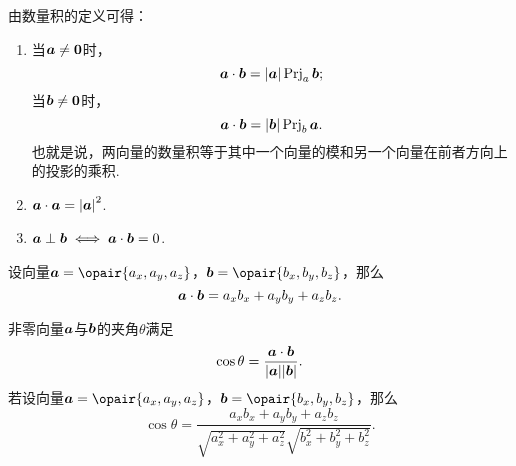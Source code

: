 \begin{property}
由数量积的定义可得：\begin{enumerate}
\item 当\(\boldsymbol{a}\neq\boldsymbol{0}\)时，\[
\boldsymbol{a}\cdot\boldsymbol{b} = \abs{\boldsymbol{a}} \operatorname{Prj}_a\boldsymbol{b};
\]当\(\boldsymbol{b}\neq\boldsymbol{0}\)时，\[
\boldsymbol{a}\cdot\boldsymbol{b} = \abs{\boldsymbol{b}} \operatorname{Prj}_b\boldsymbol{a}.
\]也就是说，两向量的数量积等于其中一个向量的模和另一个向量在前者方向上的投影的乘积.
\item \(\boldsymbol{a}\cdot\boldsymbol{a} = \abs{\boldsymbol{a}}^2\).
\item \(\boldsymbol{a}\perp\boldsymbol{b} \iff \boldsymbol{a}\cdot\boldsymbol{b}=0\).
\end{enumerate}
\end{property}

\begin{theorem}
设向量\(\mat{a}=\opair{a_x,a_y,a_z}\)，\(\mat{b}=\opair{b_x,b_y,b_z}\)，那么\begin{equation}
\boldsymbol{a}\cdot\boldsymbol{b} = a_x b_x + a_y b_y + a_z b_z.
\end{equation}
\end{theorem}

\begin{property}
非零向量\(\boldsymbol{a}\)与\(\boldsymbol{b}\)的夹角\(\theta\)满足\begin{equation}
\cos\theta = \frac{\boldsymbol{a}\cdot\boldsymbol{b}}{\abs{\boldsymbol{a}}\abs{\boldsymbol{b}}}.
\end{equation}
若设向量\(\mat{a}=\opair{a_x,a_y,a_z}\)，\(\mat{b}=\opair{b_x,b_y,b_z}\)，那么\begin{equation}
\cos\theta = \frac{a_x b_x + a_y b_y + a_z b_z}{\sqrt{a_x^2 + a_y^2 + a_z^2} \sqrt{b_x^2 + b_y^2 + b_z^2}}.
\end{equation}
\end{property}

